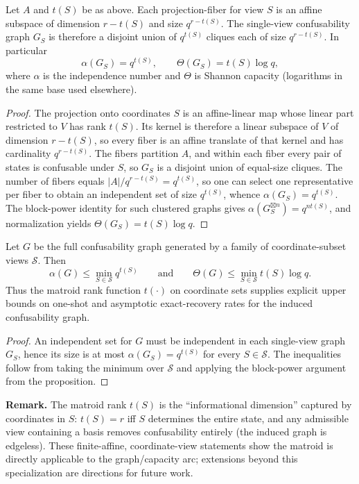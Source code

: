 \begin{proposition}
Let $A$ and $t(S)$ be as above. Each projection-fiber for view $S$ is an affine subspace of dimension $r-t(S)$ and size $q^{r-t(S)}$. The single-view confusability graph $G_S$ is therefore a disjoint union of $q^{t(S)}$ cliques each of size $q^{r-t(S)}$. In particular
\[
\alpha(G_S)=q^{t(S)},\qquad \Theta(G_S)=t(S)\log q,
\]
where $\alpha$ is the independence number and $\Theta$ is Shannon capacity (logarithms in the same base used elsewhere).
\end{proposition}

\begin{proof}
The projection onto coordinates $S$ is an affine-linear map whose linear part restricted to $V$ has rank $t(S)$. Its kernel is therefore a linear subspace of $V$ of dimension $r-t(S)$, so every fiber is an affine translate of that kernel and has cardinality $q^{r-t(S)}$. The fibers partition $A$, and within each fiber every pair of states is confusable under $S$, so $G_S$ is a disjoint union of equal-size cliques. The number of fibers equals $|A|/q^{r-t(S)}=q^{t(S)}$, so one can select one representative per fiber to obtain an independent set of size $q^{t(S)}$, whence $\alpha(G_S)=q^{t(S)}$. The block-power identity for such clustered graphs gives $\alpha(G_S^{\boxtimes n})=q^{nt(S)}$, and normalization yields $\Theta(G_S)=t(S)\log q$.
\end{proof}

\begin{corollary}\label{cor:matroid-capacity-bounds}
Let $G$ be the full confusability graph generated by a family of coordinate-subset views $\mathcal S$. Then
\[
\alpha(G)\le \min_{S\in\mathcal S} q^{t(S)}
\qquad\text{and}\qquad
\Theta(G) \le \min_{S\in\mathcal S} t(S)\log q.
\]
Thus the matroid rank function $t(\cdot)$ on coordinate sets supplies explicit upper bounds on one-shot and asymptotic exact-recovery rates for the induced confusability graph.
\end{corollary}

\begin{proof}
An independent set for $G$ must be independent in each single-view graph $G_S$, hence its size is at most $\alpha(G_S)=q^{t(S)}$ for every $S\in\mathcal S$. The inequalities follow from taking the minimum over $\mathcal S$ and applying the block-power argument from the proposition.
\end{proof}

\noindent\textbf{Remark.} The matroid rank $t(S)$ is the ``informational dimension'' captured by coordinates in $S$: $t(S)=r$ iff $S$ determines the entire state, and any admissible view containing a basis removes confusability entirely (the induced graph is edgeless). These finite-affine, coordinate-view statements show the matroid is directly applicable to the graph/capacity arc; extensions beyond this specialization are directions for future work.

